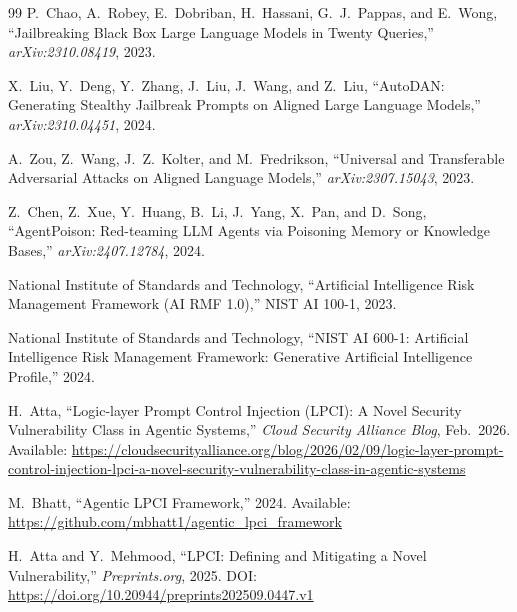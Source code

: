 \documentclass[10pt,twocolumn]{article}
\begin{document}
\begin{thebibliography}{99}
P.~Chao, A.~Robey, E.~Dobriban, H.~Hassani, G.~J.~Pappas, and E.~Wong,
``Jailbreaking Black Box Large Language Models in Twenty Queries,''
\textit{arXiv:2310.08419}, 2023.

X.~Liu, Y.~Deng, Y.~Zhang, J.~Liu, J.~Wang, and Z.~Liu,
``AutoDAN: Generating Stealthy Jailbreak Prompts on Aligned Large Language
Models,'' \textit{arXiv:2310.04451}, 2024.

A.~Zou, Z.~Wang, J.~Z.~Kolter, and M.~Fredrikson,
``Universal and Transferable Adversarial Attacks on Aligned Language Models,''
\textit{arXiv:2307.15043}, 2023.

Z.~Chen, Z.~Xue, Y.~Huang, B.~Li, J.~Yang, X.~Pan, and D.~Song,
``AgentPoison: Red-teaming LLM Agents via Poisoning Memory or Knowledge
Bases,'' \textit{arXiv:2407.12784}, 2024.

National Institute of Standards and Technology,
``Artificial Intelligence Risk Management Framework (AI RMF 1.0),''
NIST AI 100-1, 2023.

National Institute of Standards and Technology,
``NIST AI 600-1: Artificial Intelligence Risk Management Framework:
Generative Artificial Intelligence Profile,'' 2024.

H.~Atta,
``Logic-layer Prompt Control Injection (LPCI): A Novel Security Vulnerability
Class in Agentic Systems,''
\textit{Cloud Security Alliance Blog}, Feb.\ 2026.
Available: \url{https://cloudsecurityalliance.org/blog/2026/02/09/logic-layer-prompt-control-injection-lpci-a-novel-security-vulnerability-class-in-agentic-systems}

M.~Bhatt,
``Agentic LPCI Framework,'' 2024.
Available: \url{https://github.com/mbhatt1/agentic_lpci_framework}

H.~Atta and Y.~Mehmood,
``LPCI: Defining and Mitigating a Novel Vulnerability,''
\textit{Preprints.org}, 2025.
DOI: \url{https://doi.org/10.20944/preprints202509.0447.v1}

\end{thebibliography}
\end{document}
